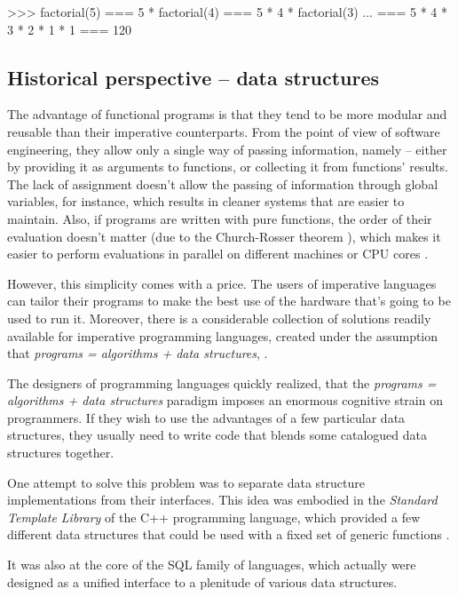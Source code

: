 \begin{Snippet}
  >>> factorial(5)
  === 5 * factorial(4)
  === 5 * 4 * factorial(3)
  ...
  === 5 * 4 * 3 * 2 * 1 * 1
  === 120
\end{Snippet}

\subsection{Historical perspective -- data structures}

The advantage of functional programs is that they tend to be more
modular and reusable than their imperative counterparts. From the
point of view of software engineering, they allow only a single way
of passing information, namely -- either by providing it as arguments to
functions, or collecting it from functions' results. The lack of
assignment doesn't allow the passing of information through global variables,
for instance, which results in cleaner systems that are easier
to maintain. Also, if programs are written with pure functions,
the order of their evaluation doesn't matter (due to the
Church-Rosser theorem\cite{Harrison1997} \cite{FelleisenFlatt2006}),
which makes it easier to perform evaluations in parallel on different
machines or CPU cores\cite{Backus1977} \cite{Dybvig1987}.

However, this simplicity comes with a price. The users of
imperative languages can tailor their programs to make the best
use of the hardware that's going to be used to run it. Moreover,
there is a considerable collection of solutions readily available
for imperative programming languages, created under the assumption
that \emph{programs = algorithms + data structures}\cite{Wirth1976},
\cite{CLRS}. 

The designers of programming languages quickly realized, that
the \emph{programs = algorithms + data structures} paradigm
imposes an enormous cognitive strain on programmers. If they
wish to use the advantages of a few particular data structures,
they usually need to write code that blends some catalogued data
structures together.

One attempt to solve this problem was to separate data structure
implementations from their interfaces. This idea was embodied
in the \emph{Standard Template Library} of the C++ programming
language, which provided a few different data structures that
could be used with a fixed set of generic functions\cite{Stroustrup1997}
\cite{Stepanov1986}.

It was also at the core of the SQL family of languages, which
actually were designed as a unified interface to a plenitude
of various data structures.

